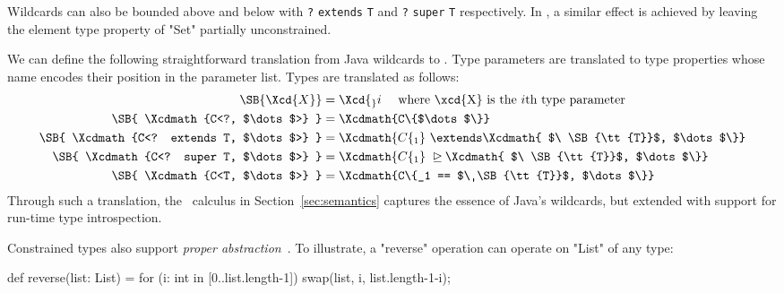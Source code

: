 Wildcards can
also be bounded above and below with
{\tt ?} {\tt extends} {\tt T} and {\tt ?} {\tt super} {\tt T} respectively.
%
In \Xten{}, a similar effect is achieved by leaving the
element type property of \xcd"Set" partially unconstrained.

We can define the following straightforward translation
from Java wildcards to \Xten{}.
Type parameters are translated to type properties whose name
encodes their position in the parameter list.
Types are translated as follows:
{\footnotesize
\begin{align*}
\SB{ \Xcd{X} } &= \Xcd{_}i ~~~~\mbox{where \xcd{X} is the $i$th type parameter} \\
\SB{ \Xcdmath{C<?, $\dots$>} } &= \Xcdmath{C\{$\dots$\}} \\
\SB{ \Xcdmath{C<? extends T, $\dots$>} } &= \Xcdmath{C\{_1 } \ \extends\Xcdmath{ $\ \SB{\tt{T}}$, $\dots$\}} \\
\SB{ \Xcdmath{C<? super T, $\dots$>} } &= \Xcdmath{C\{_1 } \ \unrhd\Xcdmath{ $\ \SB{\tt{T}}$, $\dots$\}} \\
\SB{ \Xcdmath{C<T, $\dots$>} } &= \Xcdmath{C\{_1 == $\ \SB{\tt{T}}$, $\dots$\}}
\end{align*}}
Through such a translation, the \FXG\ calculus in
Section~\ref{sec:semantics} captures the essence of Java's
wildcards, but extended with support for run-time type
introspection.


Constrained types also support
\emph{proper abstraction}~\cite{adding-wildcards}.  To illustrate, a
\xcd"reverse"
operation can operate on \xcd"List" of any type:
{\footnotesize
\begin{xten}
def reverse(list: List) = {
  for (i: int in [0..list.length-1])
    swap(list, i, list.length-1-i);
}
\end{xten}}

